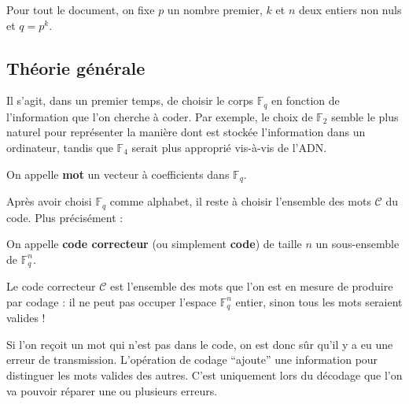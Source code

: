



	
	
	\nocite{[FFN]}
	\nocite{[PEY]}
	\nocite{[BMP]}

	Pour tout le document, on fixe $p$ un nombre premier, $k$ et $n$ deux entiers non nuls et $q = p^k$.
	
	\subsection{Théorie générale}
	
	Il s'agit, dans un premier temps, de choisir le corps $\mathbb{F}_q$ en fonction de l'information que l'on cherche à coder. Par exemple, le choix de $\mathbb{F}_2$ semble le plus naturel pour représenter la manière dont est stockée l'information dans un ordinateur, tandis que $\mathbb{F}_4$ serait plus approprié vis-à-vis de l'ADN.
	
	\begin{definition}
		On appelle \textbf{mot} un vecteur à coefficients dans $\mathbb{F}_q$.
	\end{definition}
	
	Après avoir choisi $\mathbb{F}_q$ comme alphabet, il reste à choisir l'ensemble des mots $\mathcal{C}$ du code. Plus précisément :
	
	\begin{definition}
		On appelle \textbf{code correcteur} (ou simplement \textbf{code}) de taille $n$ un sous-ensemble de $\mathbb{F}_q^n$.
	\end{definition}
	
	\begin{remark}
		Le code correcteur $\mathcal{C}$ est l'ensemble des mots que l'on est en mesure de produire par codage : il ne peut pas occuper l'espace $\mathbb{F}_q^n$ entier, sinon tous les mots seraient valides !
	\end{remark}
	
	Si l'on reçoit un mot qui n'est pas dans le code, on est donc sûr qu'il y a eu une erreur de transmission. L'opération de codage ``ajoute'' une information pour distinguer les mots valides des autres. C'est uniquement lors du décodage que l'on va pouvoir réparer une ou plusieurs erreurs.
	
